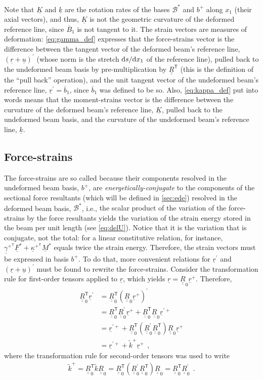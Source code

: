 \documentclass[12pt,a4paper,oneside,english]{abntex2} %
\newcommand{\fix}[1]{{\color{red}#1}}
\newcommand{\vect}[1]{\underline{#1}}
\newcommand{\uvec}[1]{\overline{#1}}
\def\tens#1{\underline{\underline{#1}}}
\def\til#1{\widetilde{#1}}
\def\lp{\left(}
\def\rp{\right)}
\def\T{\mathsf{T}}
\def\bp{b^+}
\def\B*{\mathcal{B}^*}
\def\xo{x_1}
\def\R{\tens{R}}
\def\RT{\R^\T}
\def\Rz{\R_0}
\def\Rzp{\R^{\prime}_0}
\def\RzT{\R^\T_0}
\def\r{\vect{r}}
\def\rplus{\r^{+}}
\def\rprime{\r^{\prime}}
\def\rpprime{\r^{\prime +}}
\def\u{\vect{u}}
\def\gam{\vect{\gamma}}
\def\gampT{\gam^{+^\T}}
\def\kap{\vect{\kappa}}
\def\kappT{\kap^{+^\T}}
\def\k{\vect{k}}
\def\ktil{\til{k}}
\def\ktilp{\ktil^{+}}
\def\K{\vect{K}}
\def\F{\vect{F}}
\def\Fs{\F^*}
\def\M{\vect{M}}
\def\Ms{\M^*}
\def\d{\textnormal{d}}
\begin{document}
\fix{Note that $\K$ and $\k$ are the rotation rates of the bases $\B*$ and $\bp$ along $\xo$ (their axial vectors), and thus, $\K$ is not the geometric curvature of the deformed reference line, since $\uvec{B}_1$ is not tangent to it.} The strain vectors are measures of deformation: \cref{eq:gamma_def} expresses that the force-strains vector is the difference between the \fix{tangent vector} of the deformed beam's reference line, $\lp\r+\u\rp^\prime$ \fix{(whose norm is the stretch $\d s/\d\xo$ of the reference line)}, pulled back to the undeformed beam basis by pre-multiplication by $\RT$ (this is the definition of the ``pull back'' operation), and the unit tangent vector of the undeformed beam's reference line, $\rprime = \uvec{b}_1$, since $\uvec{b}_1$ was defined to be so. Also, \cref{eq:kappa_def} put into words means that the moment-strains vector is the difference between the curvature of the deformed beam's reference line, $\K$, pulled back to the undeformed beam basis, and the curvature of the undeformed beam's reference line, $\k$.

\subsection{Force-strains}

The force-strains are so called because their components resolved in the undeformed beam basis, $\bp$, are \textit{energetically-conjugate} to the components of the sectional force resultants (which will be defined in \cref{sec:ede}) resolved in the deformed beam basis, $\B*$, i.e., \fix{the scalar product of the variation of the force-strains by the force resultants yields the variation of the strain energy stored in the beam per unit length (see \cref{eq:delU}). Notice that it is the variation that is conjugate, not the total: for a linear constitutive relation, for instance, $\gampT\Fs+\kappT\Ms$ equals twice the strain energy}. Therefore, the strain vectors must be expressed in basis $\bp$. To do that, more convenient relations for $\rprime$ and $\lp\r+\u\rp^\prime$ must be found to rewrite the force-strains. Consider the transformation rule for first-order tensors applied to $\r$, which yields $\r = \Rz\rplus$. Therefore,
\begin{align}
    \RzT\rprime &= \RzT\lp\Rz\rplus\rp^\prime \nonumber 
    \\
    &= \RzT\Rzp\rplus+\RzT\Rz\rpprime  \nonumber 
    \\
    &= \rpprime + \RzT\lp\Rzp\RzT\rp\Rz\rplus \nonumber
    \\
    &= \rpprime + \ktilp\rplus \ \ ,
    \label{eq:Rztrprime}
\end{align}
where the transformation rule for second-order tensors was used to write 
\begin{align}
    \ktilp = \RzT\ktil\Rz = \RzT\lp\Rzp\RzT\rp\Rz = \RzT\Rzp \ \ .
    \label{eq:ktilp}
\end{align}
\end{document}
